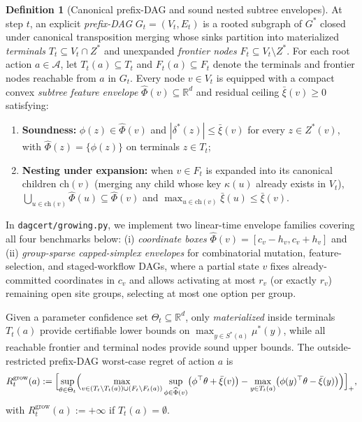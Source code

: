 \documentclass{article}
\theoremstyle{plain}
\theoremstyle{definition}
\newtheorem{definition}[theorem]{Definition}
\begin{document}
\begin{definition}[Canonical prefix-DAG and sound nested subtree envelopes]
\label{def:growing-prefix}
At step $t$, an explicit \emph{prefix-DAG} $G_t = (V_t, E_t)$ is a rooted subgraph of $G^*$ closed under canonical transposition merging whose sinks partition into materialized \emph{terminals} $T_t \subseteq V_t \cap Z^*$ and unexpanded \emph{frontier nodes} $F_t \subseteq V_t \setminus Z^*$. For each root action $a \in \mathcal{A}$, let $T_t(a) \subseteq T_t$ and $F_t(a) \subseteq F_t$ denote the terminals and frontier nodes reachable from $a$ in $G_t$. Every node $v \in V_t$ is equipped with a compact convex \emph{subtree feature envelope} $\widehat\Phi(v) \subseteq \mathbb{R}^d$ and residual ceiling $\bar\xi(v) \ge 0$ satisfying:
\begin{enumerate}[label=(\roman*),leftmargin=1.8em]
  \item \textbf{Soundness:} $\phi(z) \in \widehat\Phi(v)$ and $|\delta^*(z)| \le \bar\xi(v)$ for every $z \in Z^*(v)$, with $\widehat\Phi(z) = \{\phi(z)\}$ on terminals $z \in T_t$;
  \item \textbf{Nesting under expansion:} when $v \in F_t$ is expanded into its canonical children $\mathrm{ch}(v)$ (merging any child whose key $\kappa(u)$ already exists in $V_t$), $\bigcup_{u \in \mathrm{ch}(v)} \widehat\Phi(u) \subseteq \widehat\Phi(v)$ and $\max_{u \in \mathrm{ch}(v)} \bar\xi(u) \le \bar\xi(v)$.
\end{enumerate}
\end{definition}

In \texttt{dagcert/growing.py}, we implement two linear-time envelope families covering all four benchmarks below: (i) \emph{coordinate boxes} $\widehat\Phi(v) = [c_v - h_v, c_v + h_v]$ and (ii) \emph{group-sparse capped-simplex envelopes} for combinatorial mutation, feature-selection, and staged-workflow DAGs, where a partial state $v$ fixes already-committed coordinates in $c_v$ and allows activating at most $r_v$ (or exactly $r_v$) remaining open site groups, selecting at most one option per group.

Given a parameter confidence set $\Theta_t \subseteq \mathbb{R}^d$, only \emph{materialized} inside terminals $T_t(a)$ provide certifiable lower bounds on $\max_{y \in S^*(a)} \mu^*(y)$, while all reachable frontier and terminal nodes provide sound upper bounds. The outside-restricted prefix-DAG worst-case regret of action $a$ is
\begin{equation}
  R_t^{\mathrm{grow}}(a)
  := \Bigl[
    \sup_{\theta \in \Theta_t}
    \Bigl(
      \max_{v \in (T_t \setminus T_t(a)) \cup (F_t \setminus F_t(a))}
      \sup_{\phi \in \widehat\Phi(v)} \bigl(\phi^\top \theta + \bar\xi(v)\bigr)
      - \max_{y \in T_t(a)} \bigl(\phi(y)^\top \theta - \bar\xi(y)\bigr)
    \Bigr)
  \Bigr]_+,
  \label{eq:growing-regret}
\end{equation}
with $R_t^{\mathrm{grow}}(a) := +\infty$ if $T_t(a) = \emptyset$.
\end{document}
